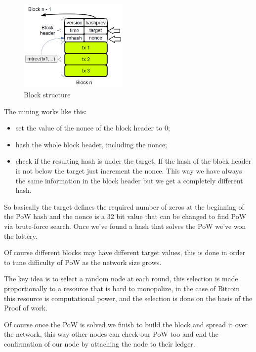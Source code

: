 \begin{figure}[H]
    \centering
    \includegraphics[width=200px]{images/6_Bitcoin/03.png}
    \caption{Block structure}
\end{figure}

The mining works like this:
\begin{itemize}
    \item set the value of the nonce of the block header to 0;
    \item hash the whole block header, including the nonce;
    \item check if the resulting hash is under the target.
    If the hash of the block header is not below the target just increment the nonce.
    This way we have always the same information in the block header but we get a completely different hash.
\end{itemize}
So basically the target defines the required number of zeros at the beginning of the PoW hash and the nonce is a 32 bit value that can be changed to find PoW via brute-force search.
Once we've found a hash that solves the PoW we've won the lottery.

Of course different blocks may have different target values, this is done in order to tune difficulty of PoW as the network size grows.

The key idea is to select a random node at each round, this selection is made proportionally to a resource that is hard to monopolize, in the case of Bitcoin this resource is computational power, and the selection is done on the basis of the Proof of work.

Of course once the PoW is solved we finish to build the block and spread it over the network, this way other nodes can check our PoW too and end the confirmation of our node by attaching the node to their ledger.

